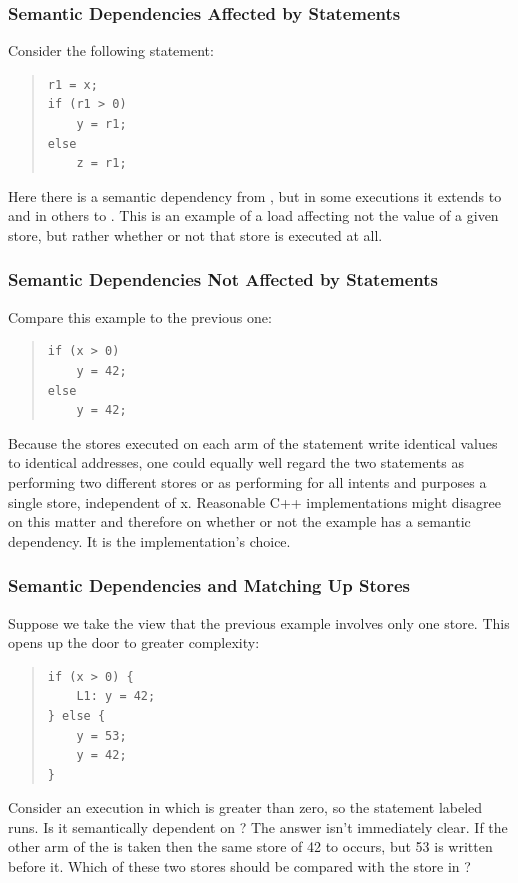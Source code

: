 \documentclass[10]{article}
\begin{document}
\subsubsection{Semantic Dependencies Affected by  Statements}
\label{sec:Semantic Dependencies Affected by if Statements}

Consider the following  statement:
\begin{quote}
\begin{verbatim}
r1 = x;
if (r1 > 0)
    y = r1;
else
    z = r1;
\end{verbatim}
\end{quote}
Here there is a semantic dependency from , but in some executions
it extends to  and in others to .
This is an example of a load affecting not the value of
a given store, but rather whether or not that store is executed at all.

\subsubsection{Semantic Dependencies Not Affected by  Statements}
\label{sec:Semantic Dependencies Not Affected by if Statements}

Compare this example to the previous one:
\begin{quote}
\begin{verbatim}
if (x > 0)
    y = 42;
else
    y = 42;
\end{verbatim}
\end{quote}
Because the stores executed on each arm of the  statement write
identical values to identical addresses, one could equally well regard
the two statements as performing two different stores or as performing
for all intents and purposes a single store, independent of x.
Reasonable C++ implementations might disagree on this matter and
therefore on whether or not the example has a semantic dependency.
It is the implementation's choice.

\subsubsection{Semantic Dependencies and Matching Up Stores}
\label{sec:Semantic Dependencies and Matching Up Stores}

Suppose we take the view that the previous example involves only one
store.
This opens up the door to greater complexity:
\begin{quote}
\begin{verbatim}
if (x > 0) {
    L1: y = 42;
} else {
    y = 53;
    y = 42;
}
\end{verbatim}
\end{quote}
Consider an execution in which  is greater than zero, so the
statement labeled  runs.
Is it semantically dependent on ?
The answer isn't immediately clear.
If the other arm of the  is taken then the same store of 42 to
 occurs, but 53 is written before it.
Which of these two stores should be compared with the store in ?
\end{document}
